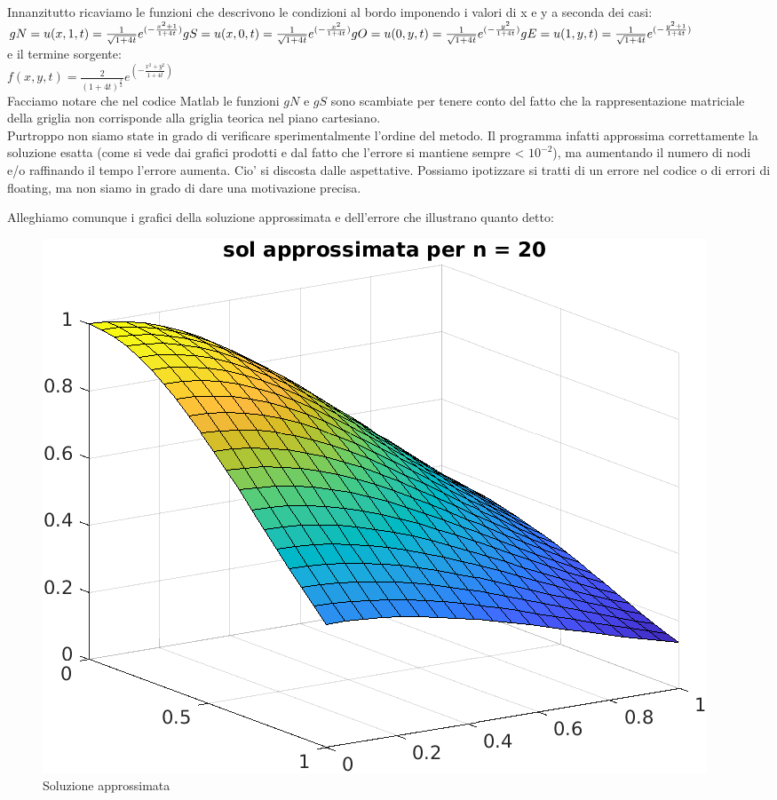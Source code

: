 \documentclass[]{article}
\begin{document}
\subsection{}
Innanzitutto ricaviamo le funzioni che descrivono le condizioni al bordo imponendo i valori di x e y a seconda dei casi:\\
$ gN = u(x,1,t) = \frac{1}{\sqrt{1+4t}} e^{(-\frac{x^2+1}{1+4t})}\\
gS = u(x,0,t) = \frac{1}{\sqrt{1+4t}} e^{(-\frac{x^2}{1+4t})}\\
gO = u(0,y,t) = \frac{1}{\sqrt{1+4t}} e^{(-\frac{y^2}{1+4t})}\\
gE = u(1,y,t) = \frac{1}{\sqrt{1+4t}} e^{(-\frac{y^2+1}{1+4t})}
$\\

e il termine sorgente:\\
$f(x,y,t) = \frac{2}{(1+4t)^{\frac{3}{2}}} e^{(-\frac{x^2+y^2}{1+4t})}$\\

Facciamo notare che nel codice Matlab le funzioni $gN$ e $gS$ sono scambiate per tenere conto del fatto che la rappresentazione matriciale della griglia non corrisponde alla griglia teorica nel piano cartesiano.\\

Purtroppo non siamo state in grado di verificare sperimentalmente l'ordine del metodo. Il programma infatti approssima correttamente la soluzione esatta (come si vede dai grafici prodotti e dal fatto che l'errore si mantiene sempre < $10^{-2}$), ma aumentando il numero di nodi e/o raffinando il tempo l'errore aumenta. Cio' si discosta dalle aspettative. Possiamo ipotizzare si tratti di un errore nel codice o di errori di floating, ma non siamo in grado di dare una motivazione precisa.

Alleghiamo comunque i grafici della soluzione approssimata e dell'errore che illustrano quanto detto:
\begin{figure}[H]
	\centering
	\includegraphics[totalheight=8cm]{grafico.png}
	\caption{Soluzione approssimata}
	\label{fig:verticalcell}
\end{figure}
\end{document}
